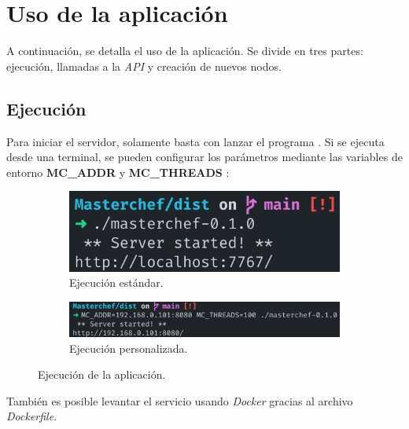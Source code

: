 \section{Uso de la aplicación} \label{sec:usage}

A continuación, se detalla el uso de la aplicación. Se divide en tres partes: ejecución, llamadas a la \textit{API} y creación de nuevos nodos.\n

\subsection{Ejecución} \label{sub:execution}

Para iniciar el servidor, solamente basta con lanzar el programa . Si se ejecuta desde una terminal, se pueden configurar los parámetros mediante las variables de entorno \textbf{MC\_ADDR} y \textbf{MC\_THREADS} :\sn

\begin{figure}[H]
     \centering
     \begin{subfigure}[b]{0.3\textwidth}
         \centering
         \includegraphics[width=\textwidth]{img/tables/38_Running.png}
         \caption{Ejecución estándar.}
         \label{fig:execdefault}
     \end{subfigure}
     \begin{subfigure}[b]{0.6\textwidth}
         \centering
         \includegraphics[width=\textwidth]{img/tables/39_Running-Env.png}
         \caption{Ejecución personalizada.}
         \label{fig:execenv}
     \end{subfigure}
    \caption{Ejecución de la aplicación.}
    \label{fig:exec}
\end{figure}

También es posible levantar el servicio usando \textit{Docker} gracias al archivo \textit{Dockerfile}.\sn

